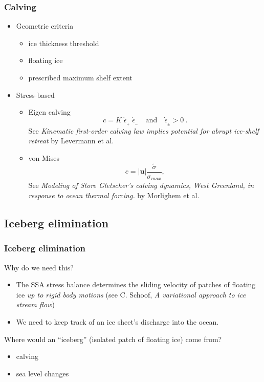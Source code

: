 \documentclass[hide notes,intlimits]{beamer}
\begin{document}
\begin{frame}
  \frametitle{Calving}

  \begin{itemize}
  \item Geometric criteria
    \begin{itemize}
    \item ice thickness threshold
    \item floating ice
    \item prescribed maximum shelf extent
    \end{itemize}
  \item Stress-based
    \begin{itemize}
    \item Eigen calving
      \begin{equation}
        \label{eq:7}
        c = K\; \dot{\epsilon}_{_+}\; \dot{\epsilon}_{_-}\quad\text{and}\quad\dot{\epsilon}_{_\pm}>0\:.
      \end{equation}
      See \emph{Kinematic first-order calving law implies
      potential for abrupt ice-shelf retreat} by Levermann et al.
    \item von Mises
      \begin{equation}
        \label{eq:8}
        c = |\mathbf{u}| \frac{\tilde{\sigma}}{\sigma_{max}},
      \end{equation}
      See \emph{Modeling of Store Gletscher’s calving dynamics, West
        Greenland, in response to ocean thermal forcing.} by Morlighem
      et al.
    \end{itemize}
  \end{itemize}
\end{frame}


\subsection{Iceberg elimination}
\label{sec:iceberg-elimination}

\begin{frame}
  \frametitle{Iceberg elimination}

  Why do we need this?

  \begin{itemize}
  \item The SSA stress balance determines the sliding velocity of
    patches of floating ice \emph{up to rigid body motions} (see C.
    Schoof, \emph{A variational approach to ice stream flow})
  \item We need to keep track of an ice sheet's discharge into the
    ocean.
  \end{itemize}

  Where would an ``iceberg'' (isolated patch of floating ice) come
  from?
  \begin{itemize}
  \item calving
  \item sea level changes
  \end{itemize}
\end{frame}
\end{document}
